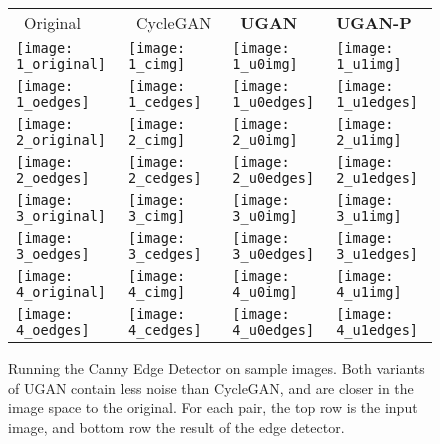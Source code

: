 
\begin{figure}
\centering
\begin{tabular}{p{1.7cm} p{1.7cm} p{1.7cm} p{1.7cm}}
  
   ~\quad Original & ~CycleGAN & ~\quad \textbf{UGAN} & \quad \textbf{UGAN-P} \\

   \texttt{[image: 1\_original]} &
   \texttt{[image: 1\_cimg]} &
   \texttt{[image: 1\_u0img]} &
   \texttt{[image: 1\_u1img]} \\ [-1ex]
   \texttt{[image: 1\_oedges]} &
   \texttt{[image: 1\_cedges]} &
   \texttt{[image: 1\_u0edges]} &
   \texttt{[image: 1\_u1edges]} \\

   \texttt{[image: 2\_original]} &
   \texttt{[image: 2\_cimg]} &
   \texttt{[image: 2\_u0img]} &
   \texttt{[image: 2\_u1img]} \\ [-1ex]
   \texttt{[image: 2\_oedges]} &
   \texttt{[image: 2\_cedges]} &
   \texttt{[image: 2\_u0edges]} &
   \texttt{[image: 2\_u1edges]} \\

   \texttt{[image: 3\_original]} &
   \texttt{[image: 3\_cimg]} &
   \texttt{[image: 3\_u0img]} &
   \texttt{[image: 3\_u1img]} \\ [-1ex]
   \texttt{[image: 3\_oedges]} &
   \texttt{[image: 3\_cedges]} &
   \texttt{[image: 3\_u0edges]} &
   \texttt{[image: 3\_u1edges]} \\
   
   \texttt{[image: 4\_original]} &
   \texttt{[image: 4\_cimg]} &
   \texttt{[image: 4\_u0img]} &
   \texttt{[image: 4\_u1img]} \\ [-1ex]
   \texttt{[image: 4\_oedges]} &
   \texttt{[image: 4\_cedges]} &
   \texttt{[image: 4\_u0edges]} &
   \texttt{[image: 4\_u1edges]} \\

\end{tabular}
\caption{Running the Canny Edge Detector on sample images. Both variants of UGAN contain less noise than CycleGAN,
and are closer in the image space to the original. For each pair, the top row is the input image, and bottom row
the result of the edge detector.}
\label{fig:canny_samples}
\end{figure}

